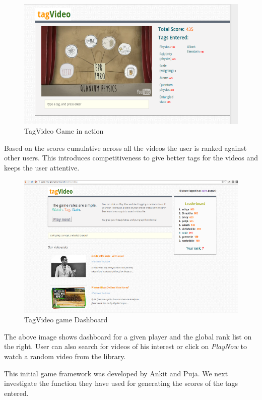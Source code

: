\documentclass[12pt]{report}
\begin{document}
\begin{figure}[h!]
\centering
\includegraphics[width=1.0\textwidth]{tagVideoGame.png}
\caption{TagVideo Game in action}
\end{figure}

Based on the scores cumulative across all the videos the user is ranked against other users. This introduces competitiveness to give better tags for the videos and keeps the user attentive.

\begin{figure}[h!]
\centering
\includegraphics[width=1.0\textwidth]{tagVideoDashboard.png}
\caption{TagVideo game Dashboard}
\end{figure}

The above image shows dashboard for a given player and the global rank list on the right. User can also search for videos of his interest or click on \emph{PlayNow} to watch a random video from the library.

This initial game framework was developed by Ankit and Puja. We next investigate the function they have used for generating the scores of the tags entered.
\end{document}
